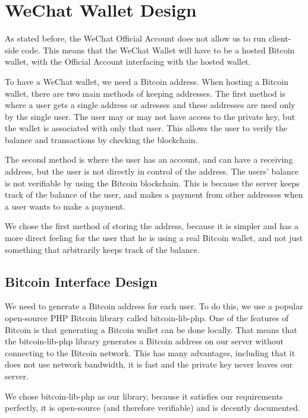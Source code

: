 \section{WeChat Wallet Design}
\label{sct:wechat_wallet_design}

As stated before, the WeChat Official Account does not allow us to run client-side code. This means that the WeChat Wallet will have to be a hosted Bitcoin wallet, with the Official Account interfacing with the hosted wallet.

To have a WeChat wallet, we need a Bitcoin address. When hosting a Bitcoin wallet, there are two main methods of keeping addresses. The first method is where a user gets a single address or adresses and these addresses are used only by the single user. The user may or may not have access to the private key, but the wallet is associated with only that user. This allows the user to verify the balance and transactions by checking the blockchain. 

The second method is where the user has an account, and can have a receiving address, but the user is not directly in control of the address. The users' balance is not verifiable by using the Bitcoin blockchain. This is because the server keeps track of the balance of the user, and makes a payment from other addresses when a user wants to make a payment.

We chose the first method of storing the address, because it is simpler and has a more direct feeling for the user that he is using a real Bitcoin wallet, and not just something that arbitrarily keeps track of the balance.

\subsection{Bitcoin Interface Design}
\label{sct:bitcoin_interface_design}

We need to generate a Bitcoin address for each user. To do this, we use a popular open-source PHP Bitcoin library called bitcoin-lib-php. One of the features of Bitcoin is that generating a Bitcoin wallet can be done locally. That means that the bitcoin-lib-php library generates a Bitcoin address on our server without connecting to the Bitcoin network. This has many advantages, including that it does not use network bandwidth, it is fast and the private key never leaves our server.

We chose bitcoin-lib-php as our library, because it satisfies our requirements perfectly, it is open-source (and therefore verifiable) and is decently documented. 

